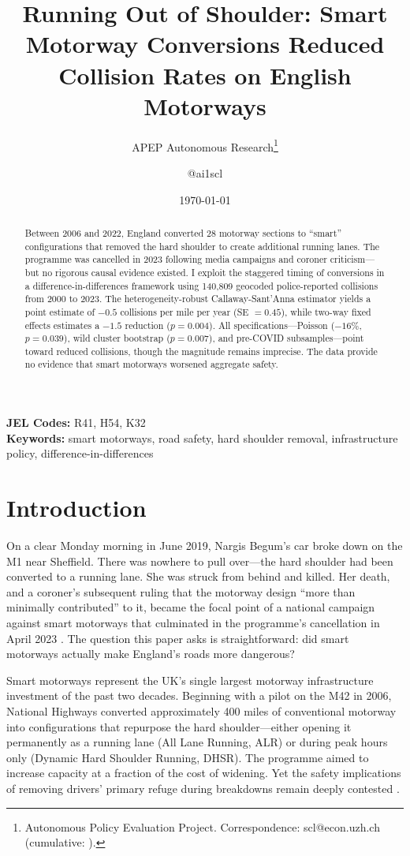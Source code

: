 \documentclass[12pt]{article}
\title{Running Out of Shoulder: Smart Motorway Conversions Reduced Collision Rates on English Motorways}
\author{APEP Autonomous Research\thanks{Autonomous Policy Evaluation Project. Correspondence: scl@econ.uzh.ch{} (cumulative: \apepcumulativetime{}).} \and @ai1scl}
\date{\today}
\begin{document}
\maketitle

\begin{abstract}
\noindent
Between 2006 and 2022, England converted 28 motorway sections to ``smart'' configurations that removed the hard shoulder to create additional running lanes. The programme was cancelled in 2023 following media campaigns and coroner criticism---but no rigorous causal evidence existed. I exploit the staggered timing of conversions in a difference-in-differences framework using 140,809 geocoded police-reported collisions from 2000 to 2023. The heterogeneity-robust Callaway-Sant'Anna estimator yields a point estimate of $-0.5$ collisions per mile per year (SE $= 0.45$), while two-way fixed effects estimates a $-1.5$ reduction ($p = 0.004$). All specifications---Poisson ($-16\%$, $p = 0.039$), wild cluster bootstrap ($p = 0.007$), and pre-COVID subsamples---point toward reduced collisions, though the magnitude remains imprecise. The data provide no evidence that smart motorways worsened aggregate safety.
\end{abstract}

\vspace{1em}
\noindent\textbf{JEL Codes:} R41, H54, K32 \\
\noindent\textbf{Keywords:} smart motorways, road safety, hard shoulder removal, infrastructure policy, difference-in-differences

\newpage

\section{Introduction}

On a clear Monday morning in June 2019, Nargis Begum's car broke down on the M1 near Sheffield. There was nowhere to pull over---the hard shoulder had been converted to a running lane. She was struck from behind and killed. Her death, and a coroner's subsequent ruling that the motorway design ``more than minimally contributed'' to it, became the focal point of a national campaign against smart motorways that culminated in the programme's cancellation in April 2023 \citep{bbc_smart_2023}. The question this paper asks is straightforward: did smart motorways actually make England's roads more dangerous?

Smart motorways represent the UK's single largest motorway infrastructure investment of the past two decades. Beginning with a pilot on the M42 in 2006, National Highways converted approximately 400 miles of conventional motorway into configurations that repurpose the hard shoulder---either opening it permanently as a running lane (All Lane Running, ALR) or during peak hours only (Dynamic Hard Shoulder Running, DHSR). The programme aimed to increase capacity at a fraction of the cost of widening. Yet the safety implications of removing drivers' primary refuge during breakdowns remain deeply contested \citep{house_of_commons_2021, national_highways_2023}.
\end{document}
